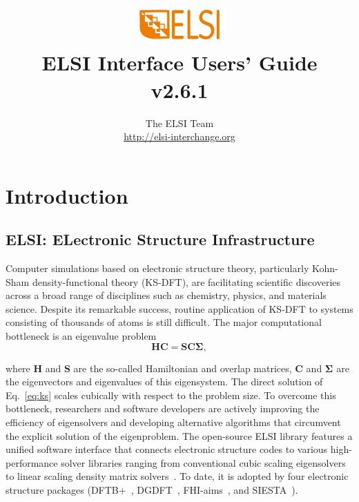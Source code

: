\documentclass{report}
\begin{document}
\title{\includegraphics[scale=0.07]{elsi_logo.png}\\ \vspace{0.5cm} \textbf{ELSI Interface Users' Guide\\ v2.6.1}}
\author{The ELSI Team\\ \url{http://elsi-interchange.org}}
\maketitle

\tableofcontents

\chapter{Introduction}
\section{ELSI: ELectronic Structure Infrastructure}
\label{sec:elsi}
Computer simulations based on electronic structure theory, particularly Kohn-Sham density-functional theory (KS-DFT), are facilitating scientific discoveries across a broad range of disciplines such as chemistry, physics, and materials science. Despite its remarkable success, routine application of KS-DFT to systems consisting of thousands of atoms is still difficult. The major computational bottleneck is an eigenvalue problem
\begin{equation}
\label{eq:ks}
\boldsymbol{H} \boldsymbol{C} = \boldsymbol{S} \boldsymbol{C} \boldsymbol{\Sigma},
\end{equation}

where $\boldsymbol{H}$ and $\boldsymbol{S}$ are the so-called Hamiltonian and overlap matrices, $\boldsymbol{C}$ and $\boldsymbol{\Sigma}$ are the eigenvectors and eigenvalues of this eigensystem. The direct solution of Eq.~\ref{eq:ks} scales cubically with respect to the problem size. To overcome this bottleneck, researchers and software developers are actively improving the efficiency of eigensolvers and developing alternative algorithms that circumvent the explicit solution of the eigenproblem. The open-source ELSI library features a unified software interface that connects electronic structure codes to various high-performance solver libraries ranging from conventional cubic scaling eigensolvers to linear scaling density matrix solvers~\cite{elsi_yu_2018}. To date, it is adopted by four electronic structure packages (DFTB+~\cite{dftb_aradi_2007}, DGDFT~\cite{dgdft_hu_2015}, FHI-aims~\cite{fhiaims_blum_2009}, and SIESTA~\cite{siesta_soler_2002}).
\end{document}
